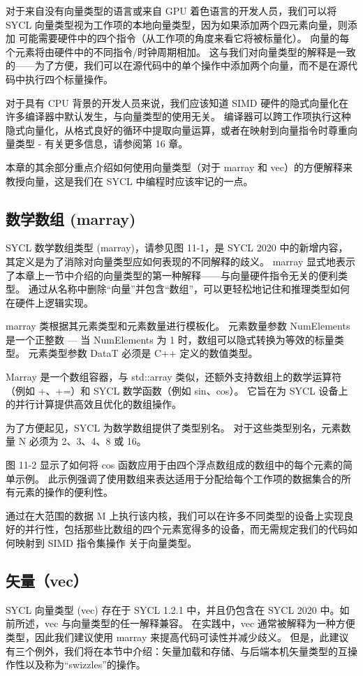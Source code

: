 对于来自没有向量类型的语言或来自 GPU 着色语言的开发人员，我们可以将 SYCL 向量类型视为工作项的本地向量类型，因为如果添加两个四元素向量，则添加 可能需要硬件中的四个指令（从工作项的角度来看它将被标量化）。 向量的每个元素将由硬件中的不同指令/时钟周期相加。 这与我们对向量类型的解释是一致的——为了方便，我们可以在源代码中的单个操作中添加两个向量，而不是在源代码中执行四个标量操作。

对于具有 CPU 背景的开发人员来说，我们应该知道 SIMD 硬件的隐式向量化在许多编译器中默认发生，与向量类型的使用无关。 编译器可以跨工作项执行这种隐式向量化，从格式良好的循环中提取向量运算，或者在映射到向量指令时尊重向量类型 - 有关更多信息，请参阅第 16 章。

本章的其余部分重点介绍如何使用向量类型（对于 marray 和 vec）的方便解释来教授向量，这是我们在 SYCL 中编程时应该牢记的一点。

\subsection{数学数组 (marray)}
SYCL 数学数组类型 (marray)，请参见图 11-1，是 SYCL 2020 中的新增内容，其定义是为了消除对向量类型应如何表现的不同解释的歧义。 marray 显式地表示了本章上一节中介绍的向量类型的第一种解释——与向量硬件指令无关的便利类型。 通过从名称中删除“向量”并包含“数组”，可以更轻松地记住和推理类型如何在硬件上逻辑实现。

marray 类根据其元素类型和元素数量进行模板化。 元素数量参数 NumElements 是一个正整数 — 当 NumElements 为 1 时，数组可以隐式转换为等效的标量类型。 元素类型参数 DataT 必须是 C++ 定义的数值类型。

Marray 是一个数组容器，与 std::array 类似，还额外支持数组上的数学运算符（例如 +、+=）和 SYCL 数学函数（例如 sin、cos）。 它旨在为 SYCL 设备上的并行计算提供高效且优化的数组操作。

为了方便起见，SYCL 为数学数组提供了类型别名。 对于这些类型别名，元素数量 N 必须为 2、3、4、8 或 16。

图 11-2 显示了如何将 cos 函数应用于由四个浮点数组成的数组中的每个元素的简单示例。 此示例强调了使用数组来表达适用于分配给每个工作项的数据集合的所有元素的操作的便利性。

通过在大范围的数据 M 上执行该内核，我们可以在许多不同类型的设备上实现良好的并行性，包括那些比数组的四个元素宽得多的设备，而无需规定我们的代码如何映射到 SIMD 指令集操作 关于向量类型。

\subsection{矢量（vec）}
SYCL 向量类型 (vec) 存在于 SYCL 1.2.1 中，并且仍包含在 SYCL 2020 中。如前所述，vec 与向量类型的任一解释兼容。 在实践中，vec 通常被解释为一种方便类型，因此我们建议使用 marray 来提高代码可读性并减少歧义。 但是，此建议有三个例外，我们将在本节中介绍：矢量加载和存储、与后端本机矢量类型的互操作性以及称为“swizzles”的操作。

